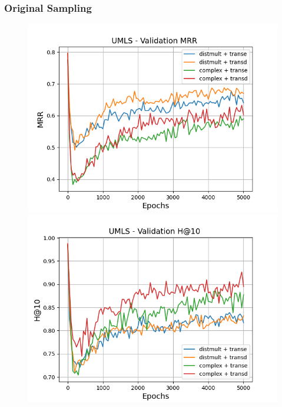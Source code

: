 \subsubsection{Original Sampling}
\begin{figure}
    \centering
    \begin{minipage}{.5\textwidth}
      \centering
      \includegraphics[width=\linewidth]{figures/results/gan_train/pretrained/random/umls/gan_train_random_umls_mrrs.png}
    \end{minipage}%
    \begin{minipage}{.5\textwidth}
      \centering
      \includegraphics[width=\linewidth]{figures/results/gan_train/pretrained/random/umls/gan_train_random_umls_hit10s.png}
    \end{minipage}
    

\end{figure}
